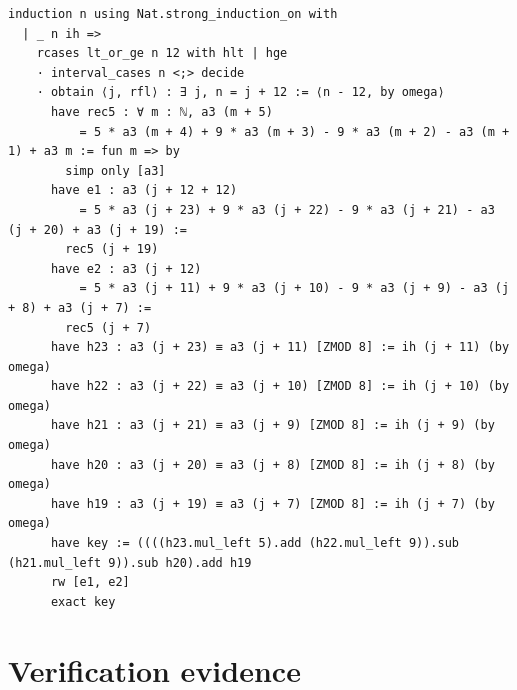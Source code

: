 \documentclass[11pt]{article}
\begin{document}
\begin{lstlisting}[caption={Proof of Theorem~\ref{thm:t3} in full (verbatim
excerpt, lines 123--144; the complete source of all four proofs is in
\texttt{proofs/01-notch-proved.lean}).},label={lst:t3proof}]
  induction n using Nat.strong_induction_on with
  | _ n ih =>
    rcases lt_or_ge n 12 with hlt | hge
    · interval_cases n <;> decide
    · obtain ⟨j, rfl⟩ : ∃ j, n = j + 12 := ⟨n - 12, by omega⟩
      have rec5 : ∀ m : ℕ, a3 (m + 5)
          = 5 * a3 (m + 4) + 9 * a3 (m + 3) - 9 * a3 (m + 2) - a3 (m + 1) + a3 m := fun m => by
        simp only [a3]
      have e1 : a3 (j + 12 + 12)
          = 5 * a3 (j + 23) + 9 * a3 (j + 22) - 9 * a3 (j + 21) - a3 (j + 20) + a3 (j + 19) :=
        rec5 (j + 19)
      have e2 : a3 (j + 12)
          = 5 * a3 (j + 11) + 9 * a3 (j + 10) - 9 * a3 (j + 9) - a3 (j + 8) + a3 (j + 7) :=
        rec5 (j + 7)
      have h23 : a3 (j + 23) ≡ a3 (j + 11) [ZMOD 8] := ih (j + 11) (by omega)
      have h22 : a3 (j + 22) ≡ a3 (j + 10) [ZMOD 8] := ih (j + 10) (by omega)
      have h21 : a3 (j + 21) ≡ a3 (j + 9) [ZMOD 8] := ih (j + 9) (by omega)
      have h20 : a3 (j + 20) ≡ a3 (j + 8) [ZMOD 8] := ih (j + 8) (by omega)
      have h19 : a3 (j + 19) ≡ a3 (j + 7) [ZMOD 8] := ih (j + 7) (by omega)
      have key := ((((h23.mul_left 5).add (h22.mul_left 9)).sub (h21.mul_left 9)).sub h20).add h19
      rw [e1, e2]
      exact key
\end{lstlisting}

\section{Verification evidence}
\end{document}
